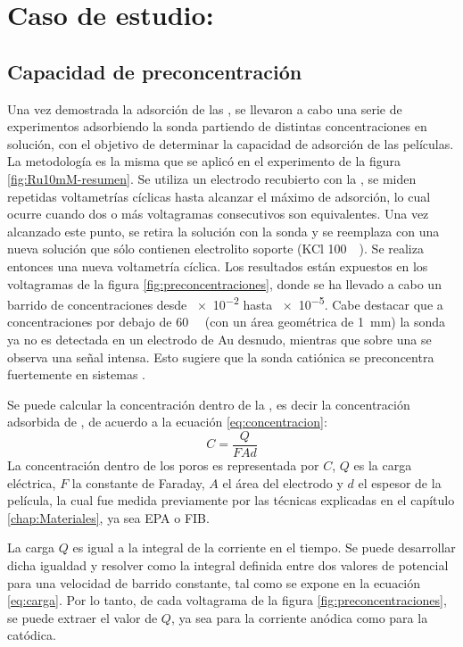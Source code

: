 \section{Caso de estudio: \texorpdfstring{\aminorutenioCompleto}{Ru(NH3)CL3}}
	
	\subsection{Capacidad de preconcentración}\label{sub:capacidad_de_preconcentraci_n}

		Una vez demostrada la adsorción \ru\space de las \pdm, se llevaron a cabo una serie de experimentos adsorbiendo la sonda partiendo de distintas concentraciones en solución, con el objetivo de determinar la capacidad de adsorción de las películas. La metodología es la misma que se aplicó en el experimento de la figura \ref{fig:Ru10mM-resumen}. Se utiliza un electrodo recubierto con la \pdmF, se miden repetidas voltametrías cíclicas hasta alcanzar el máximo de adsorción, lo cual ocurre cuando dos o más voltagramas consecutivos son equivalentes. Una vez alcanzado este punto, se retira la solución con la sonda y se reemplaza con una nueva solución que sólo contienen electrolito soporte (KCl \SI{100}{\milli\Molar}). Se realiza entonces una nueva voltametría cíclica. Los resultados están expuestos en los voltagramas de la figura \ref{fig:preconcentraciones}, donde se ha llevado a cabo un barrido de concentraciones desde \SI{e-2}{\Molar} hasta \SI{e-5}{\Molar}. Cabe destacar que a concentraciones por debajo de \SI{60}{\micro\Molar} (con un área geométrica de \SI{1}{mm}) la sonda ya no es detectada en un electrodo de Au desnudo, mientras que sobre una \pdm\space se observa una señal intensa. Esto sugiere que la sonda catiónica se preconcentra fuertemente en sistemas \pdmF.


		Se puede calcular la concentración dentro de la \pdm, es decir la concentración adsorbida de \ru, de acuerdo a la ecuación \ref{eq:concentracion}:
				\begin{equation}
					C=\frac{Q}{FAd}
					\label{eq:concentracion}
					\end{equation}
		La concentración dentro de los poros es representada por $C$, $Q$ es la carga eléctrica, $F$ la constante de Faraday, $A$ el área del electrodo y $d$ el espesor de la película, la cual fue medida previamente por las técnicas explicadas en el capítulo \ref{chap:Materiales}, ya sea EPA o FIB.

			

		La carga $Q$ es igual a la integral de la corriente en el tiempo. Se puede desarrollar dicha igualdad y resolver como la integral definida entre dos valores de potencial para una velocidad de barrido constante, tal como se expone en la ecuación \ref{eq:carga}. Por lo tanto, de cada voltagrama de la figura \ref{fig:preconcentraciones}, se puede extraer el valor de $Q$, ya sea para la corriente anódica como para la catódica.
		
